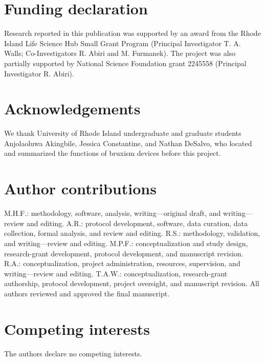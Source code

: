 \documentclass[pdflatex,sn-nature,iicol]{sn-jnl}
\begin{document}
\color{blue}
\section*{Funding declaration}
Research reported in this publication was supported by an award from the Rhode Island Life Science Hub Small Grant Program (Principal Investigator T. A. Walls; Co-Investigators R. Abiri and M. Furmanek). The project was also partially supported by National Science Foundation grant 2245558 (Principal Investigator R. Abiri).

\section*{Acknowledgements}
We thank University of Rhode Island undergraduate and graduate students Anjolaoluwa Akingbile, Jessica Constantine, and Nathan DeSalvo, who located and summarized the functions of bruxism devices before this project.
\color{black}

\color{blue}
\section*{Author contributions}
M.H.F.: methodology, software, analysis, writing---original draft, and writing---review and editing. A.R.: protocol development, software, data curation, data collection, formal analysis, and review and editing. R.S.: methodology, validation, and writing---review and editing. M.P.F.: conceptualization and study design, research-grant development, protocol development, and manuscript revision. R.A.: conceptualization, project administration, resources, supervision, and writing---review and editing. T.A.W.: conceptualization, research-grant authorship, protocol development, project oversight, and manuscript revision. All authors reviewed and approved the final manuscript.
\color{black}

\color{blue}
\section*{Competing interests}
The authors declare no competing interests.
\color{black}
\end{document}
